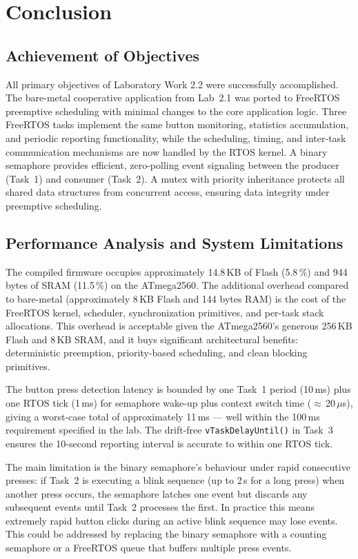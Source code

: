 \section{Conclusion}

\subsection{Achievement of Objectives}

All primary objectives of Laboratory Work 2.2 were successfully accomplished. The bare-metal cooperative application from Lab~2.1 was ported to FreeRTOS preemptive scheduling with minimal changes to the core application logic. Three FreeRTOS tasks implement the same button monitoring, statistics accumulation, and periodic reporting functionality, while the scheduling, timing, and inter-task communication mechanisms are now handled by the RTOS kernel. A binary semaphore provides efficient, zero-polling event signaling between the producer (Task~1) and consumer (Task~2). A mutex with priority inheritance protects all shared data structures from concurrent access, ensuring data integrity under preemptive scheduling.

\subsection{Performance Analysis and System Limitations}

The compiled firmware occupies approximately 14.8\,KB of Flash (5.8\,\%) and 944 bytes of SRAM (11.5\,\%) on the ATmega2560. The additional overhead compared to bare-metal (approximately 8\,KB Flash and 144 bytes RAM) is the cost of the FreeRTOS kernel, scheduler, synchronization primitives, and per-task stack allocations. This overhead is acceptable given the ATmega2560's generous 256\,KB Flash and 8\,KB SRAM, and it buys significant architectural benefits: deterministic preemption, priority-based scheduling, and clean blocking primitives.

The button press detection latency is bounded by one Task~1 period (10\,ms) plus one RTOS tick (1\,ms) for semaphore wake-up plus context switch time ($\approx$\,20\,$\mu$s), giving a worst-case total of approximately 11\,ms --- well within the 100\,ms requirement specified in the lab. The drift-free \texttt{vTaskDelayUntil()} in Task~3 ensures the 10-second reporting interval is accurate to within one RTOS tick.

The main limitation is the binary semaphore's behaviour under rapid consecutive presses: if Task~2 is executing a blink sequence (up to 2\,s for a long press) when another press occurs, the semaphore latches one event but discards any subsequent events until Task~2 processes the first. In practice this means extremely rapid button clicks during an active blink sequence may lose events. This could be addressed by replacing the binary semaphore with a counting semaphore or a FreeRTOS queue that buffers multiple press events.

